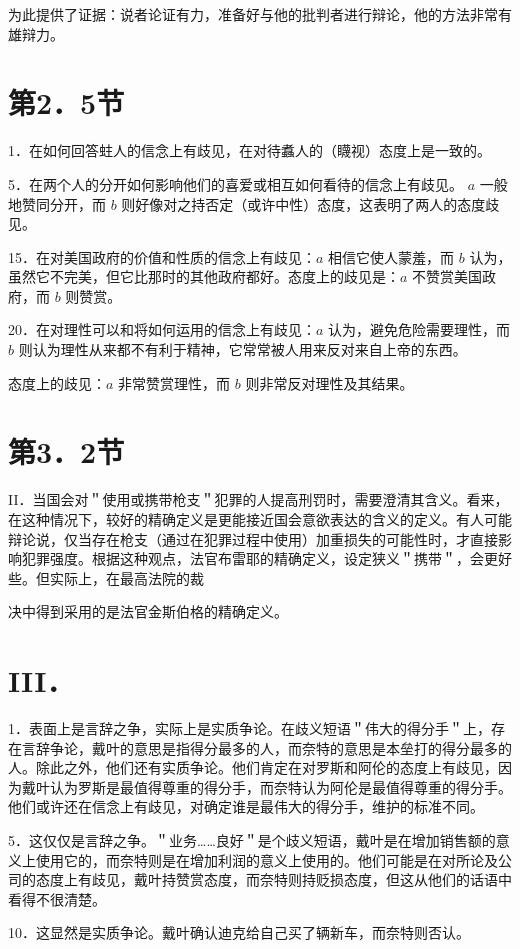 为此提供了证据：说者论证有力，准备好与他的批判者进行辩论，他的方法非常有雄辩力。

\section*{第2．5节}
1．在如何回答蛀人的信念上有歧见，在对待䘄人的（䁾视）态度上是一致的。

5．在两个人的分开如何影响他们的喜爱或相互如何看待的信念上有歧见。 $a$ 一般地赞同分开，而 $b$ 则好像对之持否定（或许中性）态度，这表明了两人的态度歧见。

15．在对美国政府的价值和性质的信念上有歧见：$a$ 相信它使人蒙羞，而 $b$ 认为，虽然它不完美，但它比那时的其他政府都好。态度上的歧见是：$a$ 不赞赏美国政府，而 $b$ 则赞赏。

20．在对理性可以和将如何运用的信念上有歧见：$a$ 认为，避免危险需要理性，而 $b$ 则认为理性从来都不有利于精神，它常常被人用来反对来自上帝的东西。

态度上的歧见：$a$ 非常赞赏理性，而 $b$ 则非常反对理性及其结果。

\section*{第3．2节}
II．当国会对＂使用或携带枪支＂犯罪的人提高刑罚时，需要澄清其含义。看来，在这种情况下，较好的精确定义是更能接近国会意欲表达的含义的定义。有人可能辩论说，仅当存在枪支（通过在犯罪过程中使用）加重损失的可能性时，才直接影响犯罪强度。根据这种观点，法官布雷耶的精确定义，设定狭义＂携带＂，会更好些。但实际上，在最高法院的裁

决中得到采用的是法官金斯伯格的精确定义。

\section*{III．}
1．表面上是言辞之争，实际上是实质争论。在歧义短语＂伟大的得分手＂上，存在言辞争论，戴叶的意思是指得分最多的人，而奈特的意思是本垒打的得分最多的人。除此之外，他们还有实质争论。他们肯定在对罗斯和阿伦的态度上有歧见，因为戴叶认为罗斯是最值得尊重的得分手，而奈特认为阿伦是最值得尊重的得分手。他们或许还在信念上有歧见，对确定谁是最伟大的得分手，维护的标准不同。

5．这仅仅是言辞之争。＂业务……良好＂是个歧义短语，戴叶是在增加销售额的意义上使用它的，而奈特则是在增加利润的意义上使用的。他们可能是在对所论及公司的态度上有歧见，戴叶持赞赏态度，而奈特则持贬损态度，但这从他们的话语中看得不很清楚。

10．这显然是实质争论。戴叶确认迪克给自己买了辆新车，而奈特则否认。


